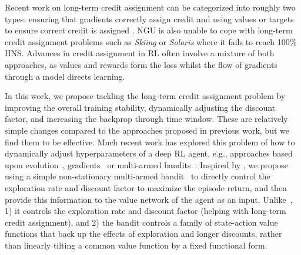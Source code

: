 \documentclass{article}
\begin{document}
Recent work on long-term credit assignment can be categorized into roughly two types: ensuring that gradients correctly assign credit \citep{ke2017sparse,weber2019credit,ferret2019credit,fortunato2019generalization} and
using values or targets to ensure correct credit is assigned \citep{arjona2019rudder,hung2019optimizing,liu2019sequence,harutyunyan2019hindsight}.
NGU is also unable to cope with long-term credit assignment problems such as \textit{Skiing} or \textit{Solaris} where it fails to reach 100\% HNS.
Advances in credit assignment in RL often involve a mixture of both approaches, as values and rewards form the loss whilst the flow of gradients through a model directs learning.

In this work, we propose tackling the long-term credit assignment problem by improving the overall training stability, dynamically adjusting the discount factor, and increasing the backprop through time window.
These are relatively simple changes compared to the approaches proposed in previous work, but we find them to be effective.
Much recent work has explored this problem of how to dynamically adjust hyperparameters of a deep RL agent, e.g., approaches based upon evolution~\citep{jaderberg2017population}, gradients~\citep{xu2018meta} or multi-armed bandits~\citep{schaul2019adapting}.
Inspired by \citet{schaul2019adapting}, we propose using a simple non-stationary multi-armed bandit~\citep{garivier2008upperconfidence} to directly control the exploration rate and discount factor to maximize the episode return, and then provide this information to the value network of the agent as an input.
Unlike~\citet{schaul2019adapting}, 1) it controls the exploration rate and discount factor (helping with long-term credit assignment), and
2) the bandit controls a family of state-action value functions that back up the effects of exploration and longer discounts, rather than linearly tilting a common value function by a fixed functional form.
\end{document}
